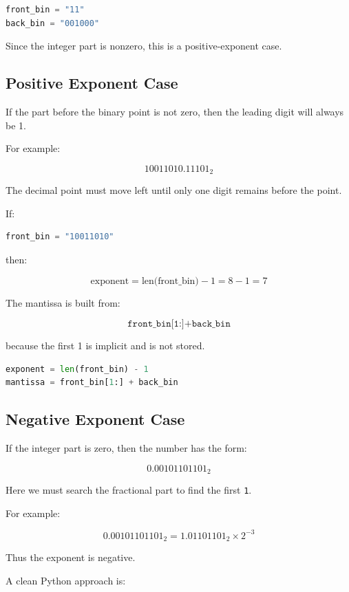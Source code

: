 \documentclass[11pt]{article}
\begin{document}
\begin{lstlisting}[language=Python]
front_bin = "11"
back_bin = "001000"
\end{lstlisting}

Since the integer part is nonzero, this is a positive-exponent case.

\subsection{Positive Exponent Case}

If the part before the binary point is not zero, then the leading digit will always be 1.

For example:

\[
10011010.11101_2
\]

The decimal point must move left until only one digit remains before the point.

If:

\begin{lstlisting}[language=Python]
front_bin = "10011010"
\end{lstlisting}

then:

\[
\text{exponent} = \text{len(front\_bin)} - 1 = 8 - 1 = 7
\]

The mantissa is built from:

\[
\texttt{front\_bin[1:]} + \texttt{back\_bin}
\]

because the first 1 is implicit and is not stored.

\begin{lstlisting}[language=Python]
exponent = len(front_bin) - 1
mantissa = front_bin[1:] + back_bin
\end{lstlisting}

\subsection{Negative Exponent Case}

If the integer part is zero, then the number has the form:

\[
0.00101101101_2
\]

Here we must search the fractional part to find the first \texttt{1}.

For example:

\[
0.00101101101_2 = 1.01101101_2 \times 2^{-3}
\]

Thus the exponent is negative.

A clean Python approach is:
\end{document}
